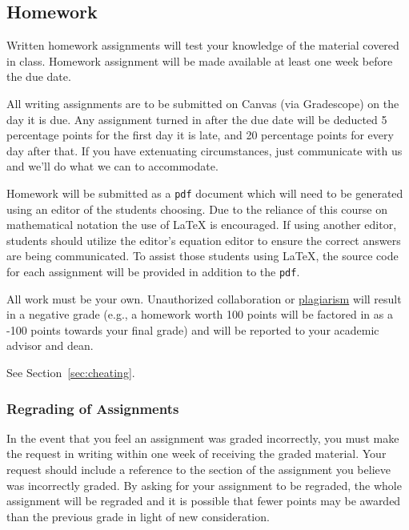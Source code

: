 \documentclass[12pt]{scrartcl}
\begin{document}
\subsection{Homework}

Written homework assignments will test your knowledge of the material covered in class. 
Homework assignment will be made available at least one week before the due date.

All writing assignments are to be submitted on Canvas (via Gradescope) on the day it is due.  
Any assignment turned in after the due date will be deducted 5 percentage points for the first day it is late, 
and 20 percentage points for every day after that.
If you have extenuating circumstances, just communicate with us and we'll do what we can to accommodate.  

Homework will be submitted as a \texttt{pdf} document which will need to be generated using an editor of the students choosing. 
Due to the reliance of this course on mathematical notation the use of \LaTeX{} is encouraged. 
If using another editor, students should utilize the editor's equation editor to ensure the correct answers are being communicated. 
To assist those students using \LaTeX, the source code for each assignment will be provided in addition to the \texttt{pdf}.

\begin{tcolorbox}[colback=red!5,colframe=red!75!black,title=Cheating policy]
All work must be your own. Unauthorized collaboration or \href{https://www.cmu.edu/student-affairs/ocsi/}{plagiarism} will result in a negative grade (e.g., a homework worth 100 points will be factored in as a -100 points towards your final grade) and will be reported to your academic advisor and dean.

\vspace{1em}
See Section~\ref{sec:cheating}.
\end{tcolorbox}

\subsubsection{Regrading of Assignments}
In the event that you feel an assignment was graded incorrectly, 
you must make the request in writing within one week of receiving the graded material.  
Your request should include a reference to the section of the assignment you believe was incorrectly graded.   
By asking for your assignment to be regraded, 
the whole assignment will be regraded and it is possible that fewer points 
may be awarded than the previous grade in light of new consideration.
\end{document}
